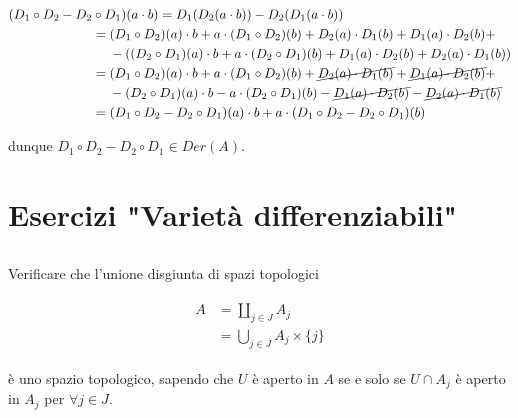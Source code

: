 \begin{align}
	\begin{split}
		(D_{1} \circ D_{2} - D_{2} &\circ D_{1})(a \cdot b) = D_{1}(D_{2}(a \cdot b)) - D_{2}(D_{1}(a \cdot b))\\
		&= (D_{1} \circ D_{2})(a) \cdot b + a \cdot (D_{1} \circ D_{2})(b) + D_{2}(a) \cdot D_{1}(b) + D_{1}(a) \cdot D_{2}(b) +\\
		& \hspace{13px} - ((D_{2} \circ D_{1})(a) \cdot b + a \cdot (D_{2} \circ D_{1})(b) + D_{1}(a) \cdot D_{2}(b) + D_{2}(a) \cdot D_{1}(b))\\
		&= (D_{1} \circ D_{2})(a) \cdot b + a \cdot (D_{1} \circ D_{2})(b) + \cancel{ D_{2}(a) \cdot D_{1}(b) } + \cancel{ D_{1}(a) \cdot D_{2}(b) } +\\
		& \hspace{13px} - (D_{2} \circ D_{1})(a) \cdot b - a \cdot (D_{2} \circ D_{1})(b) - \cancel{ D_{1}(a) \cdot D_{2}(b) } - \cancel{ D_{2}(a) \cdot D_{1}(b) }\\
		&= (D_{1} \circ D_{2} - D_{2} \circ D_{1})(a) \cdot b + a \cdot (D_{1} \circ D_{2} - D_{2} \circ D_{1})(b)
	\end{split}
\end{align}

dunque $ D_{1} \circ D_{2} - D_{2} \circ D_{1} \in Der(A) $.

\chapter{Esercizi "Varietà differenziabili"}

\tocless\section{}\label{BONUS2-1}

\begin{tcolorbox}
	Verificare che l'unione disgiunta di spazi topologici
	
	\begin{align}
		\begin{split}
			A &= \coprod_{j \in J} A_{j}\\
			&= \bigcup_{j \in J} A_{j} \times \{j\}
		\end{split}
	\end{align}
	
	è uno spazio topologico, sapendo che $ U $ è aperto in $ A $ se e solo se $ U \cap A_{j} $ è aperto in $ A_{j} $ per $ \forall j \in J $.
\end{tcolorbox}

